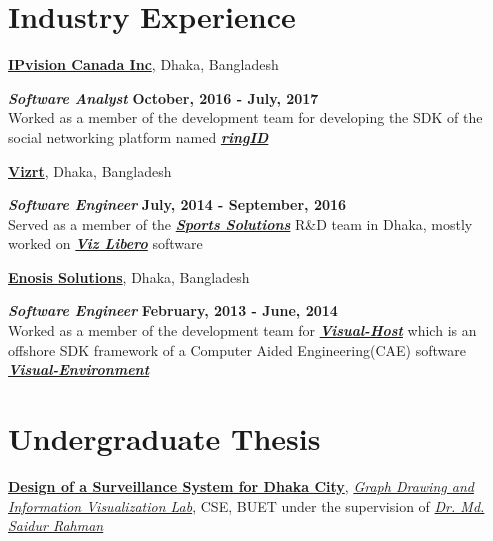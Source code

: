 \documentclass[margin,line]{res}
\begin{document}
\begin{resume}
\vspace*{-.1in}

\section{\sc Industry Experience}
{\bf \href{http://www.ipvision.ca/}{IPvision Canada Inc}}, Dhaka, Bangladesh

\vspace{-.4cm}
\textbf{{\em Software Analyst}} \hfill {\bf October, 2016 - July, 2017}\\
Worked as a member of the development team for developing the SDK of the social networking platform named \textbf{\textit{\href{https://www.ringid.com/}{ringID}}}

\vspace{-.2cm}
{\bf \href{http://www.vizrt.com/}{Vizrt}}, Dhaka, Bangladesh

\vspace{-.4cm}
\textbf{{\em Software Engineer}} \hfill {\bf July, 2014 - September, 2016}\\
Served as a member of the \textbf{\textit{\href{http://www.vizrt.com/sports/}{Sports Solutions}}} R\&D team in Dhaka, mostly worked on \textbf{\textit{\href{http://www.vizrt.com/products/viz_libero/}{Viz Libero}}} software

\vspace{-.2cm}
{\bf \href{http://www.enosisbd.com/}{Enosis Solutions}}, Dhaka, Bangladesh

\vspace{-.4cm}
\textbf{{\em Software Engineer}} \hfill {\bf February, 2013 - June, 2014}\\
Worked as a member of the development team for \textbf{\textit{\href{http://www.enosisbd.com/downloads/dev_engineering.pdf}{Visual-Host}}} which is an offshore SDK framework of a Computer Aided Engineering(CAE) software \textbf{\textit{\href{https://www.esi-group.com/software-solutions/virtual-integration-platform/multi-domain-simulation/visual-environment}{Visual-Environment}}}

\vspace*{-.1in}

\section{\sc Undergraduate Thesis} 
\href{https://cse.buet.ac.bd/research/group/gd/index.php?pageid=SurveillanceSystemDhaka}{\bf{Design of a Surveillance System for Dhaka City}}, \textit{\href{https://cse.buet.ac.bd/research/group/gd/index.php?pageid=Home.htm}{Graph Drawing and Information Visualization Lab}}, CSE, BUET under the supervision of \textit{\href{http://teacher.buet.ac.bd/saidurrahman/}{Dr. Md. Saidur Rahman}}


\end{resume}
\end{document}
